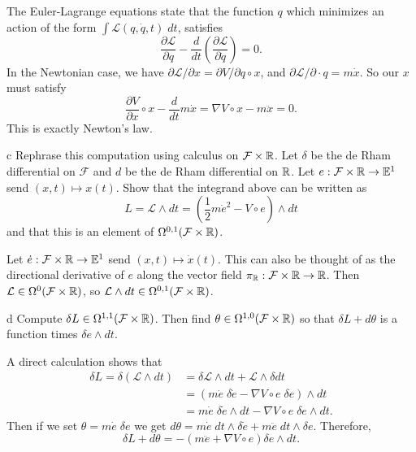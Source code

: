 \documentclass{pset}
\providecommand{\E}{\mathbb{E}}
\begin{document}
\begin{solution}
    \quad The Euler-Lagrange equations state that the function $q$ which minimizes an action of the form $\int \mathcal{L}(q, \dot{q}, t) \;dt$, satisfies
    \[
        \frac{\partial \mathcal{L}}{\partial q} - \frac{d}{dt}\left(\frac{\partial \mathcal{L}}{\partial \dot{q}}\right) = 0
    .\]  
    In the Newtonian case, we have $\partial\mathcal{L} / \partial x = \partial V / \partial q \circ x$, and $\partial \mathcal{L} / \partial \cdot{q} = m\dot{x}$. So our $x$ must satisfy
    \[
        \frac{\partial V}{\partial x}\circ x -\frac{d}{dt} m\dot{x} = \nabla V\circ x - m\ddot{x} = 0
    .\] 
    This is exactly Newton's law.

    \begin{part}{c}
        Rephrase this computation using calculus on $\mathcal{F}\times \mathbb{R}$. Let $\delta$ be the de Rham differential on $\mathcal{F}$ and $d$ be the de Rham differential on $\mathbb{R}$. Let $e : \mathcal{F} \times \R \to \E^1$ send $(x,t)\mapsto x(t)$. Show that the integrand above can be written as
        \[
            L=\mathcal{L}\wedge dt = \left(\frac{1}{2}m\dot{e}^2 - V\circ e\right)\wedge dt
        \] 
        and that this is an element of $\Omega^{0,1}(\mathcal{F}\times \mathbb{R})$.
    \end{part}

    \quad Let $\dot{e} : \mathcal{F} \times \R \to \E^1$ send $(x, t)\mapsto \dot{x}(t)$. This can also be thought of as the directional derivative of $e$ along the vector field $\pi_{\mathbb{R}} : \mathcal{F} \times \mathbb{R} \to \mathbb{R}$. Then $\mathcal{L}\in \Omega^0(\mathcal{F}\times \mathbb{R})$, so $\mathcal{L}\wedge dt\in \Omega^{0,1}(\mathcal{F}\times \mathbb{R})$.

    \begin{part}{d}
        Compute $\delta L\in \Omega^{1,1}(\mathcal{F}\times \mathbb{R})$. Then find $\theta\in \Omega^{1,0}(\mathcal{F}\times \mathbb{R})$ so that $\delta L + d\theta$ is a function times $\delta e\wedge dt$.
    \end{part}

    \quad A direct calculation shows that
    \[
        \begin{aligned}
            \delta L = \delta (\mathcal{L}\wedge dt) &= \delta \mathcal{L} \wedge dt + \mathcal{L}\wedge \delta dt\\
            &= (m\dot{e}\; \delta \dot{e} - \nabla V\circ e\;\delta e)\wedge dt\\
            &= m\dot{e}\; \delta\dot{e}\wedge dt - \nabla V\circ e\; \delta e\wedge dt.
        \end{aligned}
    \] 
    Then if we set $\theta = m\dot{e}\; \delta e$ we get $d\theta = m\dot{e}\;dt\wedge \delta \dot{e} + m\ddot{e}\;dt\wedge \delta e$. Therefore,
    \[
        \delta L + d\theta = -\left(m\ddot{e} + \nabla V\circ e\right) \delta e\wedge dt
    .\] 
    

\end{solution}
\end{document}
